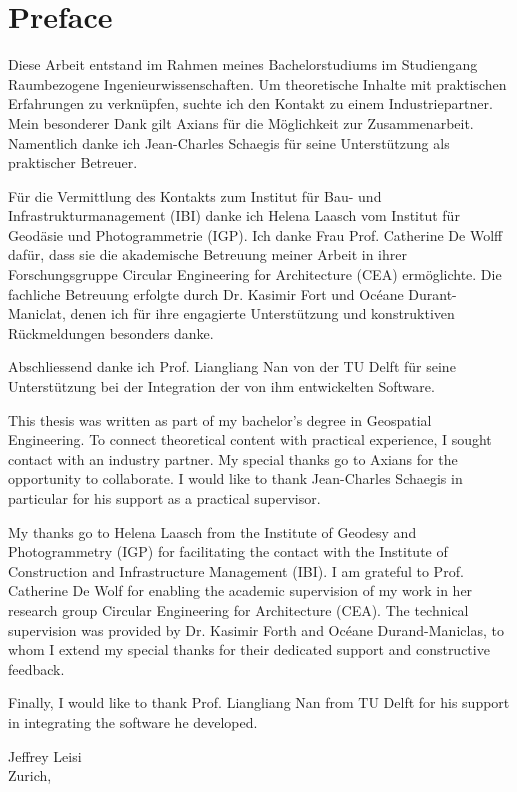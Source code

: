 \chapter*{Preface}


\begin{German}
    Diese Arbeit entstand im Rahmen meines Bachelorstudiums im Studiengang Raumbezogene Ingenieurwissenschaften. Um theoretische Inhalte mit praktischen Erfahrungen zu verknüpfen, suchte ich den Kontakt zu einem Industriepartner. Mein besonderer Dank gilt Axians für die Möglichkeit zur Zusammenarbeit. Namentlich danke ich Jean-Charles Schaegis für seine Unterstützung als praktischer Betreuer.

    Für die Vermittlung des Kontakts zum Institut für Bau- und Infrastrukturmanagement (IBI) danke ich Helena Laasch vom Institut für Geodäsie und Photogrammetrie (IGP). Ich danke Frau Prof. Catherine De Wolff dafür, dass sie die akademische Betreuung meiner Arbeit in ihrer Forschungsgruppe Circular Engineering for Architecture (CEA) ermöglichte. Die fachliche Betreuung erfolgte durch Dr. Kasimir Fort und Océane Durant-Maniclat, denen ich für ihre engagierte Unterstützung und konstruktiven Rückmeldungen besonders danke.

    Abschliessend danke ich Prof. Liangliang Nan von der TU Delft für seine Unterstützung bei der Integration der von ihm entwickelten Software.
\end{German}

\begin{English}
    This thesis was written as part of my bachelor's degree in Geospatial Engineering. To connect theoretical content with practical experience, I sought contact with an industry partner. My special thanks go to Axians for the opportunity to collaborate. I would like to thank Jean-Charles Schaegis in particular for his support as a practical supervisor.

    My thanks go to Helena Laasch from the Institute of Geodesy and Photogrammetry (IGP) for facilitating the contact with the Institute of Construction and Infrastructure Management (IBI). I am grateful to Prof. Catherine De Wolf for enabling the academic supervision of my work in her research group Circular Engineering for Architecture (CEA). The technical supervision was provided by Dr. Kasimir Forth and Océane Durand-Maniclas, to whom I extend my special thanks for their dedicated support and constructive feedback.

    Finally, I would like to thank Prof. Liangliang Nan from TU Delft for his support in integrating the software he developed.
\end{English}

\begin{flushright}
Jeffrey Leisi \\
Zurich, \the\year
\end{flushright}